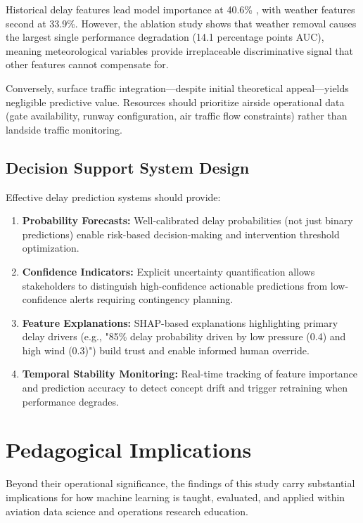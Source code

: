 \documentclass{report}
\begin{document}
Historical delay features lead model importance at 40.6\% , with weather features second at 33.9\%. However, the ablation study shows that weather removal causes the largest single performance degradation (14.1 percentage points AUC), meaning meteorological variables provide irreplaceable discriminative signal that other features cannot compensate for.

Conversely, surface traffic integration—despite initial theoretical appeal—yields negligible predictive value. Resources should prioritize airside operational data (gate availability, runway configuration, air traffic flow constraints) rather than landside traffic monitoring.

\subsection{Decision Support System Design}

Effective delay prediction systems should provide:

\begin{enumerate}
    \item \textbf{Probability Forecasts:} Well-calibrated delay probabilities (not just binary predictions) enable risk-based decision-making and intervention threshold optimization.
    
    \item \textbf{Confidence Indicators:} Explicit uncertainty quantification allows stakeholders to distinguish high-confidence actionable predictions from low-confidence alerts requiring contingency planning.
    
    \item \textbf{Feature Explanations:} SHAP-based explanations highlighting primary delay drivers (e.g., "85\% delay probability driven by low pressure (0.4) and high wind (0.3)") build trust and enable informed human override.
    
    \item \textbf{Temporal Stability Monitoring:} Real-time tracking of feature importance and prediction accuracy to detect concept drift and trigger retraining when performance degrades.
\end{enumerate}


\section{Pedagogical Implications}

Beyond their operational significance, the findings of this study carry substantial
implications for how machine learning is taught, evaluated, and applied within aviation data
science and operations research education.
\end{document}
